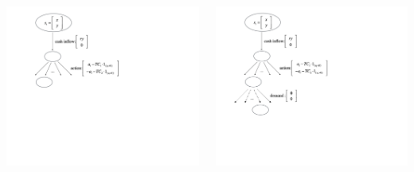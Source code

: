 \documentclass{beamer}
\begin{document}
\begin{frame}
\begin{itemize}
\begin{columns}
 {\includegraphics[scale=0.35]{mdp3}}

 {\includegraphics[scale=0.35]{mdp4}}


\end{columns}
\end{itemize}
\end{frame}
\end{document}
